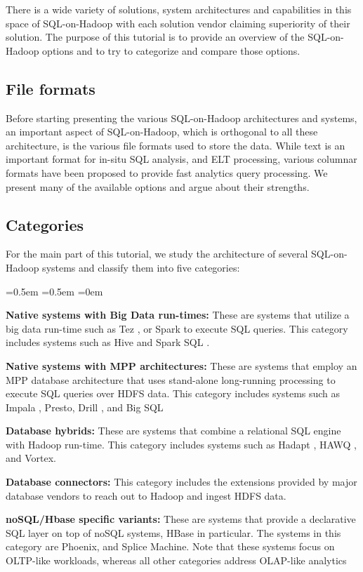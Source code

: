 \documentclass{vldb}
\newcounter{mycounter}
\begin{document}
There is a wide variety of solutions, system architectures and capabilities in this space of SQL-on-Hadoop with each solution vendor claiming superiority of their solution.
The purpose of this tutorial is to provide an overview of the SQL-on-Hadoop options and to try to categorize and compare those options.

\subsection{File formats}
Before starting presenting the various SQL-on-Hadoop architectures and systems, an important aspect of SQL-on-Hadoop, which is orthogonal to all these architecture, is the various file formats used to store the data. While text is an important format for in-situ SQL analysis, and ELT processing, various columnar formats have been proposed to provide fast analytics query processing. We present many of the available options and argue about their strengths.

\subsection{Categories}
For the main part of this tutorial, we study the architecture of several SQL-on-Hadoop systems and classify them into five categories:

\vspace{-2mm}
\setcounter{mycounter}{0}
\begin{list}{.}{\leftmargin=1.4em}
  \itemsep=0.5em
  \parsep=0.5em
  \parskip=0em
\item {{\bf Native systems with Big Data run-times:} These are systems that utilize a big data run-time such as Tez \cite{tezsigmod15}, or Spark \cite{sparkhotcloud10} to execute SQL queries. This category includes systems such as Hive \cite{hive} and Spark SQL \cite{sparkSQL}.}
\item{ {\bf Native systems with MPP architectures:} These are systems that employ an MPP database architecture that uses stand-alone long-running processing to execute SQL queries over HDFS data. This category includes systems such as Impala \cite{Kornacker+15}, Presto, Drill \cite{drill}, and Big SQL \cite{bigsql}}
\item{{\bf Database hybrids:} These are systems that combine a relational SQL engine with Hadoop run-time. This category includes systems such as Hadapt \cite{hadoopdb}, HAWQ \cite{hawq}, and Vortex.}
\item{ {\bf Database connectors:} This category includes the extensions provided by major database vendors to reach out to Hadoop and ingest HDFS data.}
\item{ {\bf noSQL/Hbase specific variants:} These are systems that provide a declarative SQL layer on top of noSQL systems, HBase in particular. The systems in this category are Phoenix, and Splice Machine. Note that these systems focus on OLTP-like workloads, whereas all other categories address OLAP-like analytics}
\end{list}
\end{document}
